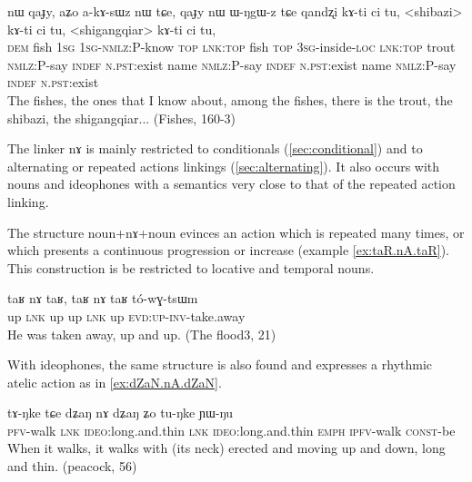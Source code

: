 \documentclass[oldfontcommands,oneside,a4paper,11pt]{article}
\newcommand{\ipa}[1]{{\phon \mbox{#1}}} %
\begin{document}
 \begin{exe}
\ex \label{ex:qaJy} 
\gll
\ipa{nɯ}  	\ipa{qaɟy,}  	\ipa{aʑo}  	\ipa{a-kɤ-sɯz}  	\ipa{nɯ}  	\ipa{tɕe,}  	\ipa{qaɟy}  	\ipa{nɯ}  	\ipa{ɯ-ŋgɯ-z}  	\ipa{tɕe}  	\ipa{qandʐi}  	\ipa{kɤ-ti}  	\ipa{ci}  	\ipa{tu,}  	<shibazi>  	\ipa{kɤ-ti}  	\ipa{ci}  	\ipa{tu,}  	<shigangqiar>  	\ipa{kɤ-ti}  	\ipa{ci}  	\ipa{tu,}  \\
\textsc{dem} fish \textsc{1sg} \textsc{1sg-nmlz:P}-know \textsc{top} \textsc{lnk:top} fish \textsc{top} \textsc{3sg}-inside-\textsc{loc} \textsc{lnk:top}  trout \textsc{nmlz}:P-say \textsc{indef} \textsc{n.pst}:exist   name  \textsc{nmlz}:P-say \textsc{indef} \textsc{n.pst}:exist   name  \textsc{nmlz}:P-say \textsc{indef} \textsc{n.pst}:exist  \\
\glt The fishes, the ones that I know about, among the fishes, there is the trout, the shibazi, the shigangqiar... (Fishes, 160-3)
\end{exe}

The linker \ipa{nɤ} is mainly restricted to conditionals (\ref{sec:conditional}) and to alternating or repeated actions linkings (\ref{sec:alternating}). It also occurs with nouns  and ideophones with a semantics very close to that of the repeated action linking. 

The structure noun+\ipa{nɤ}+noun   evinces an action which is repeated many times, or which presents a continuous progression or increase   (example \ref{ex:taR.nA.taR}). This construction is be restricted to locative and temporal nouns. 

 \begin{exe}
\ex \label{ex:taR.nA.taR} 
\gll
\ipa{taʁ}   	\ipa{nɤ}   	\ipa{taʁ,}   	\ipa{taʁ}   	\ipa{nɤ}   	\ipa{taʁ}   	\ipa{tó-wɣ-tsɯm}   \\
up \textsc{lnk} up up \textsc{lnk} up \textsc{evd:up-inv-}take.away \\
\glt He was taken away, up and up. (The flood3, 21)
\end{exe}

With  ideophones, the same structure  is also found and expresses a rhythmic atelic action as in \ref{ex:dZaN.nA.dZaN}.
 
 \begin{exe}
\ex \label{ex:dZaN.nA.dZaN} 
\gll
\ipa{tɤ-ŋke}   	\ipa{tɕe}   	\ipa{dʑaŋ} \ipa{nɤ}   	\ipa{dʑaŋ}   	\ipa{ʑo}   	\ipa{tu-ŋke}   	\ipa{ɲɯ-ŋu}   \\
\textsc{pfv}-walk \textsc{lnk} \textsc{ideo}:long.and.thin \textsc{lnk}  \textsc{ideo}:long.and.thin \textsc{emph} \textsc{ipfv}-walk \textsc{const}-be \\
\glt When it walks, it walks with (its neck) erected and moving up and down, long and thin. (peacock, 56)
\end{exe}
\end{document}
